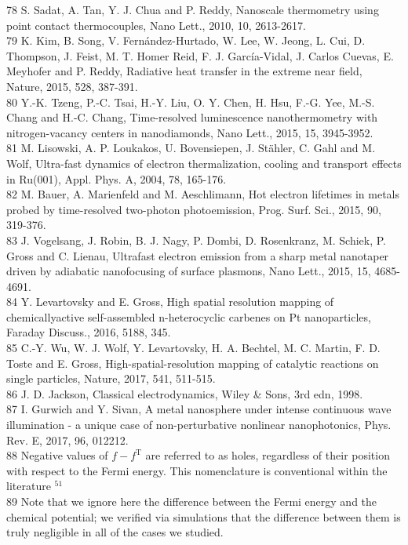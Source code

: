 \documentclass[10pt]{article}
\begin{document}
78 S. Sadat, A. Tan, Y. J. Chua and P. Reddy, Nanoscale thermometry using point contact thermocouples, Nano Lett., 2010, 10, 2613-2617.\\
79 K. Kim, B. Song, V. Fernández-Hurtado, W. Lee, W. Jeong, L. Cui, D. Thompson, J. Feist, M. T. Homer Reid, F. J. García-Vidal, J. Carlos Cuevas, E. Meyhofer and P. Reddy, Radiative heat transfer in the extreme near field, Nature, 2015, 528, 387-391.\\
80 Y.-K. Tzeng, P.-C. Tsai, H.-Y. Liu, O. Y. Chen, H. Hsu, F.-G. Yee, M.-S. Chang and H.-C. Chang, Time-resolved luminescence nanothermometry with nitrogen-vacancy centers in nanodiamonds, Nano Lett., 2015, 15, 3945-3952.\\
81 M. Lisowski, A. P. Loukakos, U. Bovensiepen, J. Stähler, C. Gahl and M. Wolf, Ultra-fast dynamics of electron thermalization, cooling and transport effects in Ru(001), Appl. Phys. A, 2004, 78, 165-176.\\
82 M. Bauer, A. Marienfeld and M. Aeschlimann, Hot electron lifetimes in metals probed by time-resolved two-photon photoemission, Prog. Surf. Sci., 2015, 90, 319-376.\\
83 J. Vogelsang, J. Robin, B. J. Nagy, P. Dombi, D. Rosenkranz, M. Schiek, P. Gross and C. Lienau, Ultrafast electron emission from a sharp metal nanotaper driven by adiabatic nanofocusing of surface plasmons, Nano Lett., 2015, 15, 4685-4691.\\
84 Y. Levartovsky and E. Gross, High spatial resolution mapping of chemicallyactive self-assembled n-heterocyclic carbenes on Pt nanoparticles, Faraday Discuss., 2016, 5188, 345.\\
85 C.-Y. Wu, W. J. Wolf, Y. Levartovsky, H. A. Bechtel, M. C. Martin, F. D. Toste and E. Gross, High-spatial-resolution mapping of catalytic reactions on single particles, Nature, 2017, 541, 511-515.\\
86 J. D. Jackson, Classical electrodynamics, Wiley \& Sons, 3rd edn, 1998.\\
87 I. Gurwich and Y. Sivan, A metal nanosphere under intense continuous wave illumination - a unique case of non-perturbative nonlinear nanophotonics, Phys. Rev. E, 2017, 96, 012212.\\
88 Negative values of $f-f^{\mathrm{T}}$ are referred to as holes, regardless of their position with respect to the Fermi energy. This nomenclature is conventional within the literature ${ }^{51}$\\
89 Note that we ignore here the difference between the Fermi energy and the chemical potential; we verified via simulations that the difference between them is truly negligible in all of the cases we studied.\\
\end{document}

